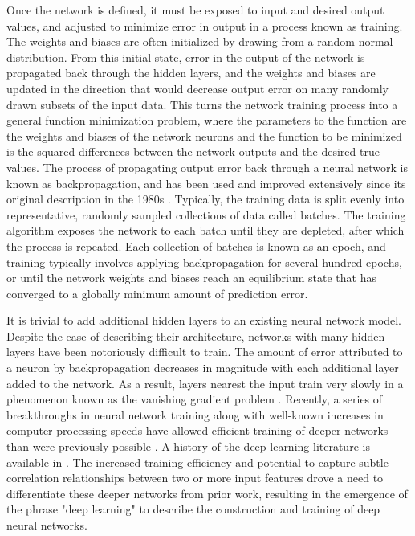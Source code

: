 Once the network is defined, it must be exposed to input and desired output
values, and adjusted to minimize error in output in a process known as training.
The weights and biases are often initialized by drawing from a
random normal distribution. From this initial state, error in 
the output of the network is propagated back through the hidden 
layers, and the weights and biases are updated in the direction that would 
decrease output error on many randomly drawn subsets of the input data. 
This turns the network training process into a general 
function minimization problem, where the parameters to the function are the 
weights and biases of the network neurons and the function to be 
minimized is the squared differences between the network outputs and 
the desired true values. The process of propagating output error back 
through a neural network is known as backpropagation, and has been used 
and improved extensively since its original description in the 
1980s \citep{rumelhart1986}.  Typically, the training data is split 
evenly into representative, randomly sampled collections of data 
called batches. The training algorithm exposes the network to each 
batch until they are depleted, after which the process is repeated. Each 
collection of batches is known as an epoch, and training typically
involves applying backpropagation for several hundred epochs, or until the network
weights and biases reach an equilibrium state that has converged to a 
globally minimum amount of prediction error.


It is trivial to add additional hidden layers to an existing neural network model.
Despite the ease of describing their architecture, networks with many hidden 
layers have been notoriously difficult to train. The amount of error
attributed to a neuron by backpropagation decreases in magnitude with each
additional layer added to the network. As a result, layers nearest the input train
very slowly in a phenomenon known as the vanishing gradient problem \citep{hochreiter1998}. 
Recently, a series of breakthroughs in neural network training along with well-known
increases in computer processing speeds have allowed efficient training
of deeper networks than were previously possible \citep{sutskever2013}.
A history of the deep learning literature is available in \cite{lecun2015}.
The increased training efficiency and potential to capture subtle
correlation relationships between two or more input features drove a need to 
differentiate these deeper networks from prior work, resulting in 
the emergence of the phrase "deep learning" to describe the construction 
and training of deep neural networks.

